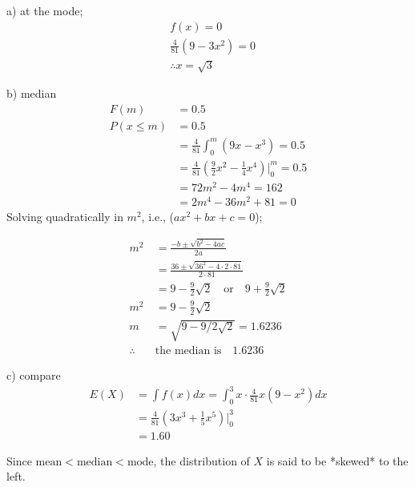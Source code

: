\documentclass[12pt,a4paper, fleq]{article}
\begin{document}
a)  at the mode; %
\begin{equation*}
\begin{split}
&f(x) = 0\\
&\frac{4}{81}(9 - 3x^2) = 0\\
&\therefore x = \sqrt 3
\end{split}
\end{equation*}

b) median%
\begin{equation*}
\begin{split}
F(m) &= 0.5\\
P(x \le m) &= 0.5\\
& = \frac{4}{81} \int_0^m (9x-x^3) =  0.5 \\
& = \frac{4}{81}\left(\frac92x^2-\frac14x^4\right)\bigg\lvert_0^m =  0.5\\
& = 72m^2 - 4m^4 =  162\\
& = 2m^4 - 36m^2 + 81 = 0
\end{split}
\end{equation*}
Solving quadratically in $m^2$, i.e., ($ax^2 + bx + c = 0$);

\begin{equation*}
\begin{split}
m^2 &= \frac{-b \pm \sqrt{b^2-4ac}}{2a}\\
&= \frac{36 \pm \sqrt{36^2-4\cdot 2\cdot 81}}{2\cdot 81}\\
&= 9 - \frac92\sqrt{2}\quad \mbox{or}\quad 9 + \frac92\sqrt{2}\\
m^2 & = 9 - \frac92\sqrt{2}\\
m &= \sqrt{9 - 9/2\sqrt{2}} = 1.6236\\
\therefore\quad &\mbox{the median is}\quad \mathbf{1.6236}
\end{split}
\end{equation*}

c) compare %
\begin{equation*}
\begin{split}
E(X) & = \int f(x)dx = \int_0^3 x\cdot\frac{4}{81}x(9-x^2)dx\\
&=  \frac{4}{81}\left(3x^3 + \frac15x^5\right)\bigg\lvert_0^3\\
&= \mathbf{1.60}
\end{split}
\end{equation*}

Since $\mbox{mean} <\mbox{median} <\mbox{mode}$, the distribution of $X$ is said to be *skewed* to the left.

 
\end{document}
